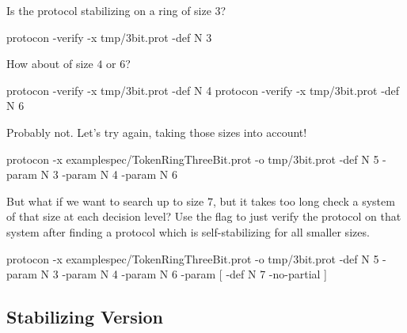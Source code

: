 Is the protocol stabilizing on a ring of size $3$?
\begin{code}
protocon -verify -x tmp/3bit.prot -def N 3
\end{code}

How about of size $4$ or $6$?
\begin{code}
protocon -verify -x tmp/3bit.prot -def N 4
protocon -verify -x tmp/3bit.prot -def N 6
\end{code}

Probably not.
Let's try again, taking those sizes into account!
\begin{code}
protocon -x examplespec/TokenRingThreeBit.prot -o tmp/3bit.prot -def N 5 -param N 3 -param N 4 -param N 6
\end{code}

But what if we want to search up to size $7$, but it takes too long check a system of that size at each decision level?
Use the  flag to just verify the protocol on that system after finding a protocol which is self-stabilizing for all smaller sizes.
\begin{code}
protocon -x examplespec/TokenRingThreeBit.prot -o tmp/3bit.prot -def N 5 -param N 3 -param N 4 -param N 6 -param [ -def N 7 -no-partial ]
\end{code}

\subsection{Stabilizing Version}





